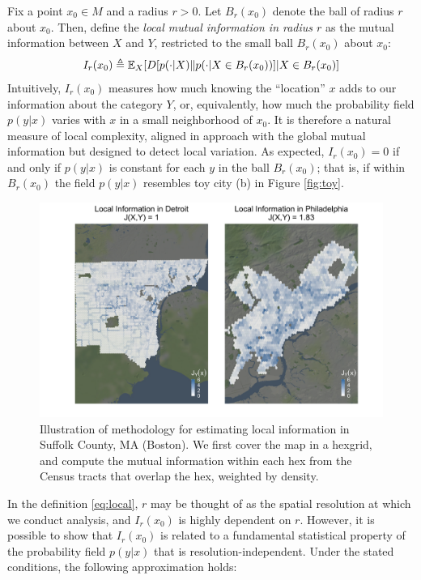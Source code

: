 		Fix a point $x_0 \in M$ and a radius $r > 0$. Let $B_r(x_0)$ denote the ball of radius $r$ about $x_0$. Then, define the \emph{local mutual information in radius $r$} as the mutual information between $X$ and $Y$, restricted to the small ball $B_r(x_0)$ about $x_0$:
		\begin{equation}
			I_r(x_0) \triangleq \mathbb{E}_X[D[p(\cdot|X)\| p(\cdot|X \in B_r(x_0))]|X \in B_r(x_0)] \label{eq:local}
		\end{equation}
		Intuitively, $I_r(x_0)$ measures how much knowing the ``location'' $x$ adds to our information about the category $Y$, or, equivalently, how much the probability field $p(y|x)$ varies with $x$ in a small neighborhood of $x_0$. It is therefore a natural measure of local complexity, aligned in approach with the global mutual information but designed to detect local variation. As expected, $I_r(x_0) = 0$ if and only if $p(y|x)$ is constant for each $y$ in the ball $B_r(x_0)$; that is, if within $B_r(x_0)$ the field $p(y|x)$ resembles toy city (b) in Figure \ref{fig:toy}. 

		\begin{figure}
			\centering
			\includegraphics[width=.5\textwidth]{figs/method_illustration.png}
			\caption{Illustration of methodology for estimating local information in Suffolk County, MA (Boston). We first cover the map in a hexgrid, and compute the mutual information within each hex from the Census tracts that overlap the hex, weighted by density. }
			\label{fig:method}
		\end{figure}

		In the definition \eqref{eq:local}, $r$ may be thought of as the spatial resolution at which we conduct analysis, and $I_r(x_0)$ is highly dependent on $r$. However, it is possible to show that $I_r(x_0)$ is related to a fundamental statistical property of the probability field $p(y|x)$ that is resolution-independent. Under the stated conditions, the following approximation holds: 

